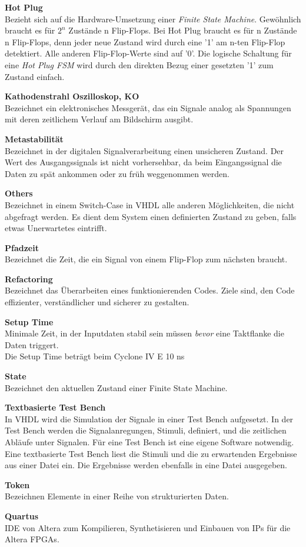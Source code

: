 \textbf{Hot Plug}\\
Bezieht sich auf die Hardware-Umsetzung einer \textit{Finite State Machine}. Gewöhnlich braucht es für \begin{math} 2^n \end{math} Zustände n Flip-Flops. Bei Hot Plug braucht es für n Zustände n Flip-Flops, denn jeder neue Zustand wird durch eine '1' am n-ten Flip-Flop detektiert. Alle anderen Flip-Flop-Werte sind auf '0'. Die logische Schaltung für eine \textit{Hot Plug FSM} wird durch den direkten Bezug einer gesetzten '1' zum Zustand einfach.


\textbf{Kathodenstrahl Oszilloskop, KO}\\
Bezeichnet ein elektronisches Messgerät, das ein Signale analog als Spannungen mit deren zeitlichem Verlauf am Bildschirm ausgibt.

\textbf{Metastabilität}\\
Bezeichnet in der  digitalen Signalverarbeitung einen unsicheren Zustand. Der Wert des Ausgangssignals ist nicht vorhersehbar, da beim Eingangssignal die Daten zu spät ankommen oder zu früh weggenommen werden.

\textbf{Others}\\
Bezeichnet in einem Switch-Case in VHDL alle anderen Möglichkeiten, die nicht abgefragt werden. Es dient dem System einen definierten Zustand zu geben, falls etwas Unerwartetes eintrifft.

\textbf{Pfadzeit}\\
Bezeichnet die Zeit, die ein Signal von einem Flip-Flop zum nächsten braucht.

\textbf{Refactoring}\\
Bezeichnet das Überarbeiten eines funktionierenden Codes. Ziele sind, den Code effizienter, verständlicher und sicherer zu gestalten.

\textbf{Setup Time} \\
Minimale Zeit, in der Inputdaten stabil sein müssen \textit{bevor} eine Taktflanke die Daten triggert.\\
Die Setup Time beträgt beim Cyclone IV E 10 ns \citep{Handbook_Altera}

\textbf{State}\\
Bezeichnet den aktuellen Zustand einer Finite State Machine.

\textbf{Textbasierte Test Bench}\\
In VHDL wird die Simulation der Signale in einer Test Bench aufgesetzt. In der Test Bench werden die Signalanregungen, Stimuli, definiert, und die zeitlichen Abläufe unter Signalen. Für eine Test Bench ist eine eigene Software notwendig.\\
Eine textbasierte Test Bench liest die Stimuli und die zu erwartenden Ergebnisse aus einer Datei ein. Die Ergebnisse werden ebenfalls in eine Datei ausgegeben.

\textbf{Token}\\
Bezeichnen Elemente in einer Reihe von strukturierten Daten.

\textbf{Quartus}\\
IDE von Altera zum Kompilieren, Synthetisieren und Einbauen von IPs für die Altera FPGAs.
